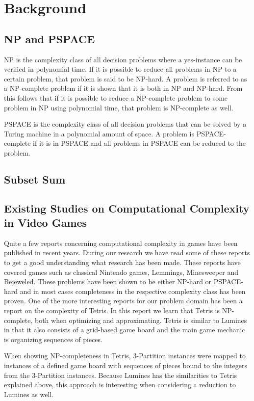 \section{Background}

\subsection{NP and PSPACE}
NP is the complexity class of all decision problems where a yes-instance can be verified in polynomial time. If it is possible to reduce all problems in NP to a certain problem, that problem is said to be NP-hard. A problem is referred to as a NP-complete problem if it is shown that it is both in NP and NP-hard. From this follows that if it is possible to reduce a NP-complete problem to some problem in NP using polynomial time, that problem is NP-complete as well.

PSPACE is the complexity class of all decision problems that can be solved by a Turing machine in a polynomial amount of space. A problem is PSPACE-complete if it is in PSPACE and all problems in PSPACE can be reduced to the problem.
\subsection{Subset Sum}


\subsection{Existing Studies on Computational Complexity in Video Games}

Quite a few reports concerning computational complexity in games have been published in recent years. During our research we have read some of these reports to get a good understanding what research has been made. These reports have covered games such as classical Nintendo games, 
Lemmings, Minesweeper and Bejeweled. These problems have been shown to be either NP-hard or PSPACE-hard and in most cases completeness in the respective complexity class has been proven.
One of the more interesting reports for our problem domain has been a report on the complexity of Tetris. In this report we learn that Tetris is NP-complete, both when optimizing and approximating. Tetris is similar to Lumines in that it also consists of a grid-based game board and the main game mechanic is organizing sequences of pieces.

When showing NP-completeness in Tetris, 3-Partition instances were mapped to instances of a defined game board with sequences of pieces bound to the integers from the 3-Partition instances. Because Lumines has the similarities to Tetris explained above, this approach is interesting when considering a reduction to Lumines as well.

